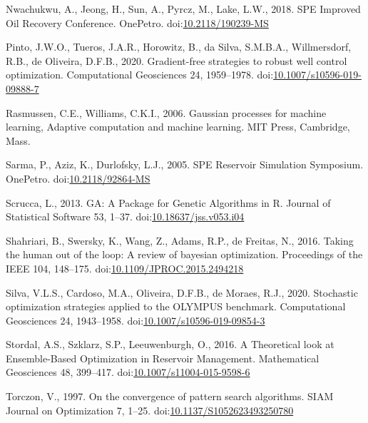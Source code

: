 \documentclass[]{elsarticle} %
\newlength{\cslhangindent}
\newenvironment{CSLReferences}[2] %
 {%
  \setlength{\parindent}{0pt}
  \ifodd #1 \everypar{\setlength{\hangindent}{\cslhangindent}}\ignorespaces\fi
  \ifnum #2 > 0
  \setlength{\parskip}{#2\baselineskip}
  \fi
 }%
 {}
\begin{document}
\begin{eqution}
\begin{CSLReferences}{1}{0}
\leavevmode{}%
Nwachukwu, A., Jeong, H., Sun, A., Pyrcz, M., Lake, L.W., 2018. SPE Improved Oil Recovery Conference. OnePetro. doi:\href{https://doi.org/10.2118/190239-MS}{10.2118/190239-MS}

\leavevmode{}%
Pinto, J.W.O., Tueros, J.A.R., Horowitz, B., da Silva, S.M.B.A., Willmersdorf, R.B., de Oliveira, D.F.B., 2020. Gradient-free strategies to robust well control optimization. Computational Geosciences 24, 1959--1978. doi:\href{https://doi.org/10.1007/s10596-019-09888-7}{10.1007/s10596-019-09888-7}

\leavevmode{}%
Rasmussen, C.E., Williams, C.K.I., 2006. Gaussian processes for machine learning, Adaptive computation and machine learning. MIT Press, Cambridge, Mass.

\leavevmode{}%
Sarma, P., Aziz, K., Durlofsky, L.J., 2005. SPE Reservoir Simulation Symposium. OnePetro. doi:\href{https://doi.org/10.2118/92864-MS}{10.2118/92864-MS}

\leavevmode{}%
Scrucca, L., 2013. GA: A Package for Genetic Algorithms in R. Journal of Statistical Software 53, 1--37. doi:\href{https://doi.org/10.18637/jss.v053.i04}{10.18637/jss.v053.i04}

\leavevmode{}%
Shahriari, B., Swersky, K., Wang, Z., Adams, R.P., de Freitas, N., 2016. Taking the human out of the loop: A review of bayesian optimization. Proceedings of the IEEE 104, 148--175. doi:\href{https://doi.org/10.1109/JPROC.2015.2494218}{10.1109/JPROC.2015.2494218}

\leavevmode{}%
Silva, V.L.S., Cardoso, M.A., Oliveira, D.F.B., de Moraes, R.J., 2020. Stochastic optimization strategies applied to the OLYMPUS benchmark. Computational Geosciences 24, 1943--1958. doi:\href{https://doi.org/10.1007/s10596-019-09854-3}{10.1007/s10596-019-09854-3}

\leavevmode{}%
Stordal, A.S., Szklarz, S.P., Leeuwenburgh, O., 2016. A Theoretical look at Ensemble-Based Optimization in Reservoir Management. Mathematical Geosciences 48, 399--417. doi:\href{https://doi.org/10.1007/s11004-015-9598-6}{10.1007/s11004-015-9598-6}

\leavevmode{}%
Torczon, V., 1997. On the convergence of pattern search algorithms. SIAM Journal on Optimization 7, 1--25. doi:\href{https://doi.org/10.1137/S1052623493250780}{10.1137/S1052623493250780}


\end{CSLReferences}
\end{eqution}
\end{document}
